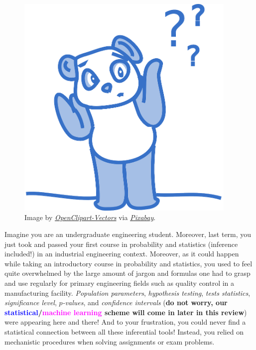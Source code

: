 \documentclass[
  letterpaper,
  DIV=11,
  numbers=noendperiod]{scrreprt}
\begin{document}
\begin{figure}[H]

{\centering \includegraphics[width=4.16667in,height=\textheight]{book/img/panda.png}

}

\caption{Image by
\href{https://pixabay.com/users/openclipart-vectors-30363/}{\emph{OpenClipart-Vectors}}
via
\href{https://pixabay.com/vectors/panda-cute-bear-blue-question-149818/}{\emph{Pixabay}}.}

\end{figure}%

Imagine you are an undergraduate engineering student. Moreover, last
term, you just took and passed your first course in probability and
statistics (inference included!) in an industrial engineering context.
Moreover, as it could happen while taking an introductory course in
probability and statistics, you used to feel quite overwhelmed by the
large amount of jargon and formulas one had to grasp and use regularly
for primary engineering fields such as quality control in a
manufacturing facility. \emph{Population parameters}, \emph{hypothesis
testing}, \emph{tests statistics}, \emph{significance level},
\emph{\(p\)-values}, and \emph{confidence intervals} (\textbf{do not
worry, our
\textcolor{blue}{statistical}/\textcolor{magenta}{machine learning}
scheme will come in later in this review}) were appearing here and
there! And to your frustration, you could never find a statistical
connection between all these inferential tools! Instead, you relied on
mechanistic procedures when solving assignments or exam problems.
\end{document}
